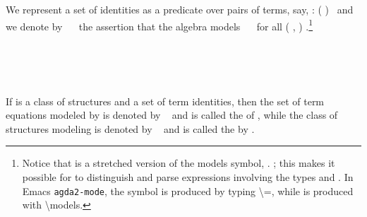 We represent a set of identities as a predicate over pairs of
terms, say,  : (    )~\au{}  and we denote by
~~ the assertion that the algebra  models ~~
for all ( , )  .\footnote{Notice that  is
a stretched version of the models symbol, %
\ifshort
.
\else
; this makes it possible for \agda to distinguish and parse expressions involving the types
 and .
In Emacs \texttt{agda2-mode}, the symbol  is produced by typing
\textbackslash\textbar{}=, while  is
produced with \textbackslash{}models.
\fi
}

\begin{code}%
\>[0]\<%
\\
\>[0][@{}l@{\AgdaIndent{1}}]%
\>[1]\AgdaSpace{}%
\AgdaSymbol{:}\AgdaSpace{}%
\AgdaSymbol{(}\AgdaSpace{}%
\AgdaSymbol{:}\AgdaSpace{}%
\AgdaSpace{}%
\AgdaSpace{}%
\AgdaSymbol{)}\AgdaSpace{}%
\AgdaSpace{}%
\AgdaSymbol{(}\AgdaSpace{}%
\AgdaSpace{}%
\AgdaSpace{}%
\AgdaSpace{}%
\AgdaSymbol{)(}\AgdaSpace{}%
\AgdaSymbol{)}\AgdaSpace{}%
\AgdaSpace{}%
\AgdaSpace{}%
\AgdaSymbol{\AgdaUnderscore{}}\<%
\\
%
\>[1]\AgdaSpace{}%
\AgdaSpace{}%
\AgdaSpace{}%
\AgdaSymbol{=}\AgdaSpace{}%
\AgdaSpace{}%
\AgdaSymbol{\{}\AgdaSpace{}%
\AgdaSymbol{\}}\AgdaSpace{}%
\AgdaSpace{}%
\AgdaSymbol{(}\AgdaSpace{}%
\AgdaOperator{\AgdaInductiveConstructor{,}}\AgdaSpace{}%
\AgdaSymbol{)}\AgdaSpace{}%
\AgdaSpace{}%
\AgdaSpace{}%
\AgdaSpace{}%
\AgdaSpace{}%
\AgdaSpace{}%
\AgdaSpace{}%
\AgdaSpace{}%
\AgdaSpace{}%
\AgdaSpace{}%
\<%
\\
\>[0]\<%
\end{code}

If  is a class of structures and  a set of term identities, then the set of
term equations modeled by  is denoted by ~ and is called the
 of , while the class of structures modeling  is
denoted by ~ and is called the  by
.

